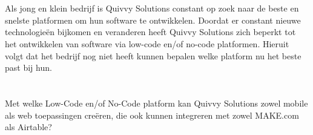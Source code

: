 \section{}%
\label{sec:probleemstelling}
Als jong en klein bedrijf is Quivvy Solutions constant op zoek naar de beste en snelste platformen om hun software te ontwikkelen. 
Doordat er constant nieuwe technologieën bijkomen en veranderen heeft Quivvy Solutions zich beperkt tot het ontwikkelen van software 
via low-code en/of no-code platformen. Hieruit volgt dat het bedrijf nog niet heeft kunnen bepalen welke platform nu het beste past bij hun.

\section{}%
\label{sec:onderzoeksvraag}
Met welke Low-Code en/of No-Code platform kan Quivvy Solutions zowel mobile als web toepassingen creëren, die ook kunnen integreren met
zowel MAKE.com als Airtable?


